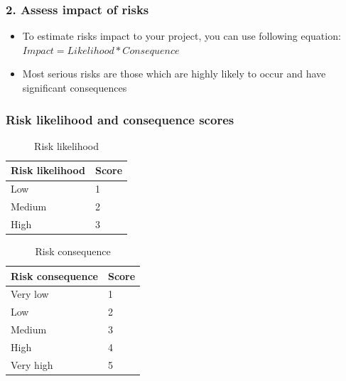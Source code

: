 \documentclass{beamer}
\begin{document}
\begin{frame}[t]\frametitle{2. Assess impact of risks}
    \begin{itemize}
        \item To estimate risks impact to your project, you can use following equation:
            $
            Impact = Likelihood * Consequence
            $
        \item Most serious risks are those which are highly likely to occur and have significant consequences

    \end{itemize}
\end{frame}

\begin{frame}[t]\frametitle{Risk likelihood and consequence scores~\cite{dawson2005projects}}
\begin{table}[htb!]
    \caption{Risk likelihood}
    \label{tab:risk_likelihood}
    \begin{center}
        \begin{tabular}{l|l}
        \hline

        \hline
        \textbf{Risk likelihood} & \textbf{Score}\\
        \hline
         Low   & 1 \\
         Medium & 2 \\
         High & 3 \\
        \hline

        \hline
        \end{tabular}
    \end{center}
\end{table}

\begin{table}[htb!]
    \caption{Risk consequence}
    \label{tab:risk_consequence}
    \begin{center}
        \begin{tabular}{l|l}
        \hline

        \hline
        \textbf{Risk consequence} & \textbf{Score} \\
        \hline
        Very low & 1 \\
        Low & 2 \\
        Medium & 3 \\
        High & 4 \\
        Very high & 5\\
        \hline

        \hline
        \end{tabular}
    \end{center}
\end{table}
\end{frame}
\end{document}
